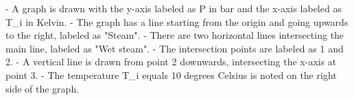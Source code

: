 - A graph is drawn with the y-axis labeled as P in bar and the x-axis labeled as T_i in Kelvin.
- The graph has a line starting from the origin and going upwards to the right, labeled as "Steam".
- There are two horizontal lines intersecting the main line, labeled as "Wet steam".
- The intersection points are labeled as 1 and 2.
- A vertical line is drawn from point 2 downwards, intersecting the x-axis at point 3.
- The temperature T_i equals 10 degrees Celsius is noted on the right side of the graph.